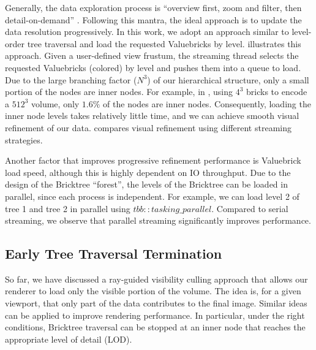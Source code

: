 Generally, the data exploration process is ``overview first, zoom and filter, then detail-on-demand''
\cite{ferster2012interactive,wang2018association}. 
Following this mantra, 
the ideal approach is to update the data resolution progressively. 
In this work, we adopt an approach similar
to level-order tree traversal and load the requested Valuebricks by level. 
illustrates this approach. Given a user-defined view frustum, the streaming thread
selects the requested Valuebricks (colored) by level and pushes them into a queue to load. Due to
the large branching factor ($N^3$) of our hierarchical structure, only a small portion of the
nodes are inner nodes. For example, in , using $4^3$ bricks to encode a
$512^3$ volume, only $1.6\%$ of the nodes are inner nodes. Consequently, loading the inner node levels
takes relatively little time, and we can achieve smooth visual refinement of our data. 
 compares visual refinement using different streaming strategies.




Another factor that improves progressive refinement performance is Valuebrick load speed,
although this is highly dependent on IO throughput. Due to the design of the Bricktree ``forest'', 
the levels of the Bricktree can be loaded in parallel, since each process is independent.
For example, we can load level 2 of tree 1 and tree 2 in parallel using $tbb::tasking\_parallel$. 
Compared to serial streaming, we observe that parallel streaming significantly improves performance. 


\subsection{Early Tree Traversal Termination}
So far, we have discussed a ray-guided visibility culling approach that allows our renderer
to load only the visible portion of the volume. The idea is, for a given viewport, that only part of the data
contributes to the final image. Similar ideas can be applied to improve 
rendering performance. In particular, under the right conditions, Bricktree traversal
can be stopped at an inner node that reaches the appropriate level of detail (LOD). 

